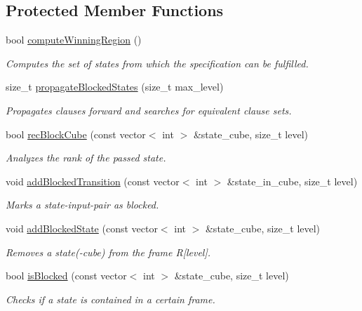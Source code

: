 \subsection*{Protected Member Functions}
\begin{DoxyCompactItemize}
\item 
bool \hyperlink{classIFM13Synth_a51c6831265e1daf7d0120c0dd954a0c4}{compute\-Winning\-Region} ()
\begin{DoxyCompactList}\small\item\em Computes the set of states from which the specification can be fulfilled. \end{DoxyCompactList}\item 
size\-\_\-t \hyperlink{classIFM13Synth_ad9262224ce1ddbda37d748fbecfe5d8e}{propagate\-Blocked\-States} (size\-\_\-t max\-\_\-level)
\begin{DoxyCompactList}\small\item\em Propagates clauses forward and searches for equivalent clause sets. \end{DoxyCompactList}\item 
bool \hyperlink{classIFM13Synth_af46e431e089225b58148ee317d523123}{rec\-Block\-Cube} (const vector$<$ int $>$ \&state\-\_\-cube, size\-\_\-t level)
\begin{DoxyCompactList}\small\item\em Analyzes the rank of the passed state. \end{DoxyCompactList}\item 
void \hyperlink{classIFM13Synth_a0aa3bd29c1621efda5abb30dd9357214}{add\-Blocked\-Transition} (const vector$<$ int $>$ \&state\-\_\-in\-\_\-cube, size\-\_\-t level)
\begin{DoxyCompactList}\small\item\em Marks a state-\/input-\/pair as blocked. \end{DoxyCompactList}\item 
void \hyperlink{classIFM13Synth_a31eb626e5ca0232d187e3471e8fed348}{add\-Blocked\-State} (const vector$<$ int $>$ \&state\-\_\-cube, size\-\_\-t level)
\begin{DoxyCompactList}\small\item\em Removes a state(-\/cube) from the frame R\mbox{[}level\mbox{]}. \end{DoxyCompactList}\item 
bool \hyperlink{classIFM13Synth_a27c2617424cad795b9af575a85e75071}{is\-Blocked} (const vector$<$ int $>$ \&state\-\_\-cube, size\-\_\-t level)
\begin{DoxyCompactList}\small\item\em Checks if a state is contained in a certain frame. \end{DoxyCompactList}\item 

\end{DoxyCompactItemize}
